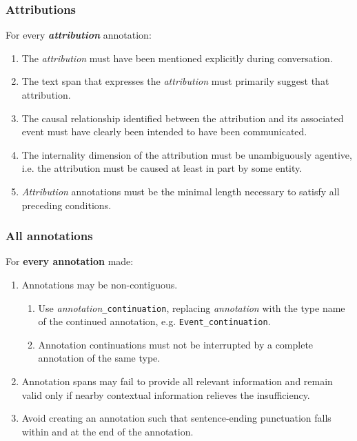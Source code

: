 \documentclass[a4paper,12pt]{article}
\begin{document}
    \subsubsection{Attributions}
    For every \textbf{\emph{attribution}} annotation:
        \begin{enumerate}
            \item The \emph{attribution} must have been mentioned explicitly during conversation.
            \item The text span that expresses the \emph{attribution} must primarily suggest that attribution. %
            \item The causal relationship identified between the attribution and its associated event must have clearly been intended to have been communicated.
            \item The internality dimension of the attribution must be unambiguously agentive, i.e. the attribution must be caused at least in part by some entity.
            \item \emph{Attribution} annotations must be the minimal length necessary to satisfy all preceding conditions.
        \end{enumerate}


    \subsubsection{All annotations}
    For \textbf{every annotation} made:
        \begin{enumerate}
            \item Annotations may be non-contiguous.
                \begin{enumerate}
                    \item Use \emph{annotation}\texttt{\_continuation}, replacing \emph{annotation} with the type name of the continued annotation, e.g. \texttt{Event\_continuation}.
                    \item Annotation continuations must not be interrupted by a complete annotation of the same type.
                \end{enumerate}
            \item Annotation spans may fail to provide all relevant information and remain valid only if nearby contextual information relieves the insufficiency.
            \item Avoid creating an annotation such that sentence-ending punctuation falls within and at the end of the annotation.
        \end{enumerate}
\end{document}
